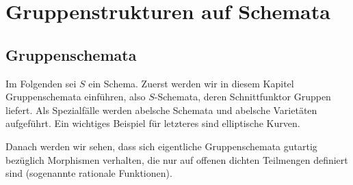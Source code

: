 \chapter{Gruppenstrukturen auf Schemata}
\label{chap:gruppenstrukturenaufschemata}
\section{Gruppenschemata}
Im Folgenden sei $S$ ein Schema.
Zuerst werden wir in diesem Kapitel Gruppenschemata einführen, also
$S$-Schemata, deren Schnittfunktor Gruppen liefert. Als Spezialfälle
werden abelsche Schemata und abelsche Varietäten aufgeführt. Ein
wichtiges Beispiel für letzteres sind elliptische Kurven.

Danach werden wir sehen, dass sich eigentliche Gruppenschemata
gutartig bezüglich Morphismen verhalten, die nur auf offenen dichten
Teilmengen definiert sind (sogenannte rationale Funktionen).

